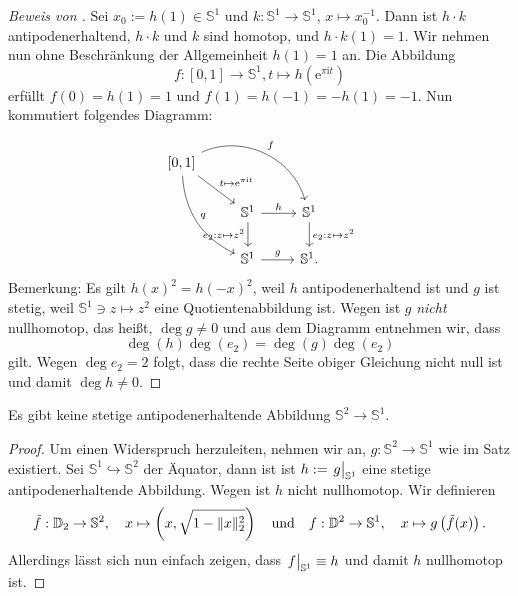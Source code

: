 \documentclass[
12pt, 
openany, 
a4paper, 
final,
fleqn, 
]{myclass}
\numberwithin{equation}{chapter}
\numberwithin{section}{chapter}
\newcommand{\Ss}{\mathbb S}
\newcommand{\DD}{\mathbb D}
\newcommand{\eval}[1]{\left. \vphantom{\int}#1\right\lvert}
\newcommand{\embed}{\hookrightarrow}
\DeclarePairedDelimiter{\norm}{\lVert}{\rVert}
\begin{document}
\begin{proof}[Beweis von ]
Sei $x_0 := h(1) \in \Ss^1$ und $k: \Ss^1 \to \Ss^1$, $x\mapsto x_0^{-1}$. Dann ist $h\cdot k$ antipodenerhaltend, $h\cdot k$ und $k$ sind homotop, und $h\cdot k(1) = 1$. Wir nehmen nun ohne Beschränkung der Allgemeinheit $h(1) = 1$ an. Die Abbildung
\[
f: [0, 1]\to \Ss^1, t \mapsto h\left(\mathrm{e}^{\pi\mathrm{i} t}\right)
\]
erfüllt $f(0) = h(1) = 1$ und $f(1) = h(-1) = -h(1) = -1$. Nun kommutiert folgendes Diagramm: 
\[
\begin{tikzcd}
{ [0, 1]} \arrow[bend left=50]{drr}{f}\arrow{dr}{t\mapsto \mathrm e^{\pi \mathrm i t}} \arrow[bend right=30]{ddr}{q} & & \\
& \Ss^1\arrow{r}{h}\arrow[swap]{d}{e_2: z\mapsto z^2} & \Ss^1 \arrow{d}{e_2: z\mapsto z^2} \\
& \Ss^1 \arrow{r}{g} & \Ss^1.
\end{tikzcd}
\]
Bemerkung: Es gilt $h(x)^2 = h(-x)^2$, weil $h$ antipodenerhaltend ist und $g$ ist stetig, weil $\Ss^1\ni z\mapsto z^2$ eine Quotientenabbildung ist. Wegen  ist $g$ \emph{nicht} nullhomotop, das heißt, $\deg g \neq 0$ und aus dem Diagramm entnehmen wir, dass 
\[
\deg (h) \deg (e_2) = \deg(g) \deg (e_2) 
\]
gilt. Wegen $\deg e_2 = 2$ folgt, dass die rechte Seite obiger Gleichung nicht null ist und damit $\deg h\neq 0$. 
\end{proof}
\begin{thr}\label{6.4}
Es gibt keine stetige antipodenerhaltende Abbildung $\Ss^2 \to \Ss^1$. 
\end{thr}
\begin{proof}
Um einen Widerspruch herzuleiten, nehmen wir an, $g: \Ss^2 \to \Ss^1$ wie im Satz existiert. 
Sei $\Ss^1 \embed \Ss^2$ der Äquator, dann ist ist $h:= \eval{g}_{\Ss^1}$ eine stetige antipodenerhaltende Abbildung. Wegen  ist $h$ nicht nullhomotop. Wir definieren
\[
\tilde f: \DD_2 \to \Ss^2, \quad x \mapsto \left(x, \sqrt{1- \norm{x}_2^2}\right) \quad \text{und}\quad f: \DD^2 \to \Ss^1, \quad x\mapsto g\left(\tilde f(x) \right). 
\]
Allerdings lässt sich nun einfach zeigen, dass $\eval f_{\Ss^1}\equiv h$ und damit $h$ nullhomotop ist. 
\end{proof}
\end{document}
